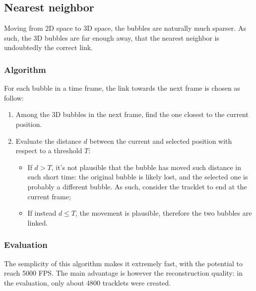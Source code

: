 \subsection{Nearest neighbor}
\label{sec:link3d:NN}

Moving from 2D space to 3D space, the bubbles are naturally much sparser.
As such, the 3D bubbles are far enough away, that the nearest neighbor is undoubtedly the correct link.

\subsubsection{Algorithm}

For each bubble in a time frame, the link towards the next frame is chosen as follow:
\begin{enumerate}
	\itemsep 0em
	\item Among the 3D bubbles in the next frame, find the one closest to the current position.
	\item Evaluate the distance $d$ between the current and selected position with respect to a threshold $T$:
	      \begin{itemize}
		      \item If $d>T$, it's not plausible that the bubble has moved such distance in such short time: the original bubble is likely lost, and the selected one is probably a different bubble. As such, consider the tracklet to end at the current frame;
		      \item If instead $d\le T$, the movement is plausible, therefore the two bubbles are linked.
	      \end{itemize}
\end{enumerate}

\subsubsection{Evaluation}

The semplicity of this algorithm makes it extremely fast, with the potential to reach 5000 FPS.
The main advantage is however the reconstruction quality: in the evaluation, only about 4800 tracklets were created.
